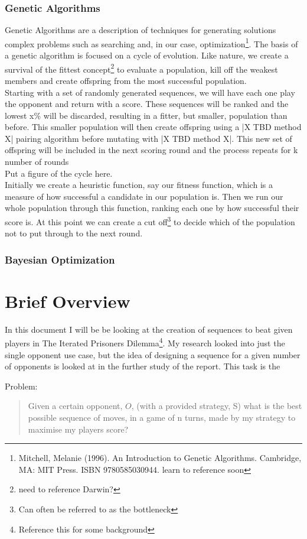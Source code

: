 \subsubsection{Genetic Algorithms}\label{ssec:genetic algorthems}
Genetic Algorithms are a description of techniques for generating solutions complex problems such as searching and, in our case, optimization\footnote{Mitchell, Melanie (1996). An Introduction to Genetic Algorithms. Cambridge, MA: MIT Press. ISBN 9780585030944. learn to reference soon}. The basis of a genetic algorithm is focused on a cycle of evolution. Like nature, we create a survival of the fittest concept\footnote{need to reference Darwin?} to evaluate a population, kill off the weakest members and create offspring from the most successful population.\\

Starting with a set of randomly generated sequences, we will have each one play the opponent and return with a score. 
These sequences will be ranked and the lowest x\% will be discarded, resulting in a fitter, but smaller, population than before. 
This smaller population will then create offspring using a |X TBD method X| pairing algorithm before mutating with |X TBD method X|. This new set of offspring will be included in the next scoring round and the process repeats for k number of rounds\\

Put a figure of the cycle here.\label{fig:genetic algo cycle} \\

Initially we create a heuristic function, say our fitness function, which is a measure of how successful a candidate in our population is. Then we run our whole population through this function, ranking each one by how successful their score is. At this point we can create a cut off\footnote{Can often be referred to as the bottleneck} to decide which of the population not to put through to the next round.\\
\subsubsection{Bayesian Optimization}

\section{Brief Overview}
In this document I will be be looking at the creation of sequences to beat given players in The Iterated Prisoners Dilemma\footnote{Reference this for some background}. My research looked into just the single opponent use case, but the idea of designing a sequence for a given number of opponents is looked at in the further study of the report. This task is the


Problem:\\
\begin{quotation}
    Given a certain opponent, \(O\), (with a provided strategy, S) what is the best possible sequence of moves, in a game of n turns, made by my strategy to maximise my players score?
\end{quotation}

